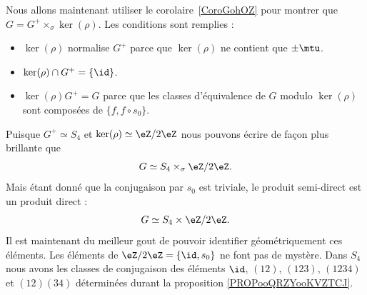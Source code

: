 Nous allons maintenant utiliser le corolaire~\ref{CoroGohOZ} pour montrer que \( G=G^+\times_{\sigma}\ker(\rho)\). Les conditions sont remplies :
\begin{itemize}
	\item \( \ker(\rho)\) normalise \( G^+\) parce que \( \ker(\rho)\) ne contient que \( \pm\mtu\).
	\item \( \ker(\rho)\cap G^+=\{ \id \}\).
	\item \( \ker(\rho)G^+=G\) parce que les classes d'équivalence de \( G\) modulo \( \ker(\rho)\) sont composées de \( \{ f,f\circ s_0 \}\).
\end{itemize}
Puisque \( G^+\simeq S_4\) et \( \ker(\rho)\simeq \eZ/2\eZ\) nous pouvons écrire de façon plus brillante que
\begin{equation}
	G\simeq S_4\times_{\sigma}\eZ/2\eZ.
\end{equation}
Mais étant donné que la conjugaison par \( s_0\) est triviale, le produit semi-direct est un produit direct :
\begin{equation}
	G\simeq S_4\times\eZ/2\eZ.
\end{equation}
Il est maintenant du meilleur gout de pouvoir identifier géométriquement ces éléments. Les éléments de \( \eZ/2\eZ=\{ \id,s_0 \}\) ne font pas de mystère. Dans \( S_4\) nous avons les classes de conjugaison des éléments \( \id\), \( (12)\), \( (123)\), \( (1234)\) et \( (12)(34)\) déterminées durant la proposition \ref{PROPooQRZYooKVZTCJ}.
